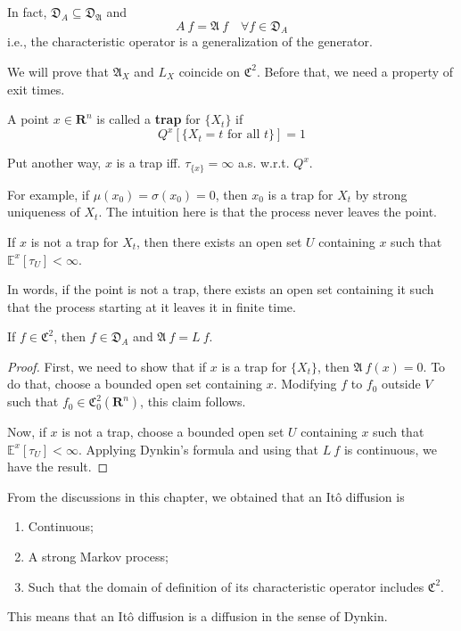 In fact, $\mathfrak{D}_{A} \subseteq \mathfrak{D}_{\mathfrak{A}}$ and 
\[
    A~f = \mathfrak{A}~f \quad \forall f \in \mathfrak{D}_A
\]
i.e., the characteristic operator is a generalization of the generator.

We will prove that $\mathfrak{A}_X$ and $L_X$ coincide on $\mathfrak{C}^2$. Before that, we need a property of exit times. 

\begin{definition}[Trap]
    A point $x \in \mathbf{R}^n$ is called a \textbf{trap} for $\{ X_t \}$ if 
    \[
        Q^x[\{ X_t = t \text{ for all } t \}] = 1
    \]

    Put another way, $x$ is a trap iff. $\tau_{\{x\}} = \infty$ a.s. w.r.t. $Q^x$. 
\end{definition}

For example, if $\mu(x_0) = \sigma(x_0) = 0$, then $x_0$ is a trap for $X_t$ by strong uniqueness of $X_t$. The intuition here is that the process never leaves the point. 

\begin{lemma}\label{lm:202301271449}
    If $x$ is not a trap for $X_t$, then there exists an open set $U$ containing $x$ such that $\mathbb{E}^x[\tau_U] < \infty$. 
\end{lemma}

In words, if the point is not a trap, there exists an open set containing it such that the process starting at it leaves it in finite time. 

\begin{theorem}
    If $f \in \mathfrak{C}^2$, then $f \in \mathfrak{D}_A$ and $\mathfrak{A}~f = L~f$.
\end{theorem}

\begin{proof}
    First, we need to show that if $x$ is a trap for $\{ X_t \}$, then $\mathfrak{A}~f(x) = 0$. To do that, choose a bounded open set containing $x$. Modifying $f$ to $f_0$ outside $V$ such that $f_0 \in \mathfrak{C}_0^2(\mathbf{R}^n)$, this claim follows. 

    Now, if $x$ is not a trap, choose a bounded open set $U$ containing $x$ such that $\mathbb{E}^x[\tau_U] < \infty$. Applying Dynkin's formula and using that $L~f$ is continuous, we have the result. 
\end{proof}

\begin{remark}
    From the discussions in this chapter, we obtained that an Itô diffusion is
    \begin{enumerate}
        \item Continuous;
        \item A strong Markov process; 
        \item Such that the domain of definition of its characteristic operator includes $\mathfrak{C}^2$.
    \end{enumerate}

    This means that an Itô diffusion is a diffusion in the sense of Dynkin. 
\end{remark}


